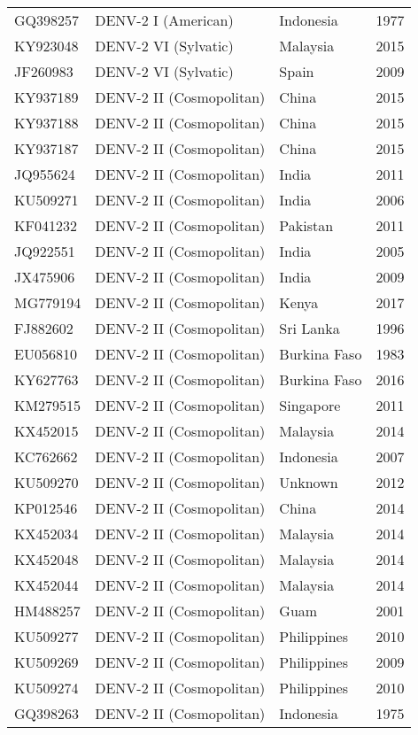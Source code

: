 \begin{scriptsize}
\begin{center}
\begin{longtable}{@{}lllc@{}}
GQ398257 & DENV-2 I (American)        & Indonesia    & 1977            \\
KY923048 & DENV-2 VI (Sylvatic)       & Malaysia     & 2015            \\
JF260983 & DENV-2 VI (Sylvatic)       & Spain        & 2009            \\
KY937189 & DENV-2 II (Cosmopolitan)   & China        & 2015            \\
KY937188 & DENV-2 II (Cosmopolitan)   & China        & 2015            \\
KY937187 & DENV-2 II (Cosmopolitan)   & China        & 2015            \\
JQ955624 & DENV-2 II (Cosmopolitan)   & India        & 2011            \\
KU509271 & DENV-2 II (Cosmopolitan)   & India        & 2006            \\
KF041232 & DENV-2 II (Cosmopolitan)   & Pakistan     & 2011            \\
JQ922551 & DENV-2 II (Cosmopolitan)   & India        & 2005            \\
JX475906 & DENV-2 II (Cosmopolitan)   & India        & 2009            \\
MG779194 & DENV-2 II (Cosmopolitan)   & Kenya        & 2017            \\
FJ882602 & DENV-2 II (Cosmopolitan)   & Sri Lanka    & 1996            \\
EU056810 & DENV-2 II (Cosmopolitan)   & Burkina Faso & 1983            \\
KY627763 & DENV-2 II (Cosmopolitan)   & Burkina Faso & 2016            \\
KM279515 & DENV-2 II (Cosmopolitan)   & Singapore    & 2011            \\
KX452015 & DENV-2 II (Cosmopolitan)   & Malaysia     & 2014            \\
KC762662 & DENV-2 II (Cosmopolitan)   & Indonesia    & 2007            \\
KU509270 & DENV-2 II (Cosmopolitan)   & Unknown      & 2012            \\
KP012546 & DENV-2 II (Cosmopolitan)   & China        & 2014            \\
KX452034 & DENV-2 II (Cosmopolitan)   & Malaysia     & 2014            \\
KX452048 & DENV-2 II (Cosmopolitan)   & Malaysia     & 2014            \\
KX452044 & DENV-2 II (Cosmopolitan)   & Malaysia     & 2014            \\
HM488257 & DENV-2 II (Cosmopolitan)   & Guam         & 2001            \\
KU509277 & DENV-2 II (Cosmopolitan)   & Philippines  & 2010            \\
KU509269 & DENV-2 II (Cosmopolitan)   & Philippines  & 2009            \\
KU509274 & DENV-2 II (Cosmopolitan)   & Philippines  & 2010            \\
GQ398263 & DENV-2 II (Cosmopolitan)   & Indonesia    & 1975           
\end{longtable}


\end{center}
\end{scriptsize}
